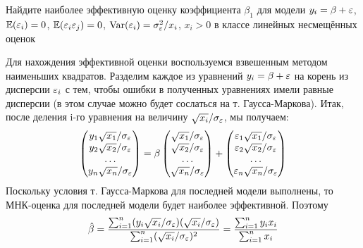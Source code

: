 \begin{problem}
Найдите наиболее эффективную оценку коэффициента $\beta_1$ для модели $y_i = \beta + \varepsilon$, $\mathbb{E}(\varepsilon_i) = 0$, $\mathbb{E}(\varepsilon_i\varepsilon_j) = 0$, $\operatorname{Var}(\varepsilon_i) = \sigma_{\varepsilon}^2 / x_i$, $x_i > 0$ в классе линейных несмещённых оценок


\begin{sol}
Для нахождения эффективной оценки воспользуемся взвешенным методом наименьших квадратов. Разделим каждое из уравнений $y_i = \beta + \varepsilon$ на корень из дисперсии $\varepsilon_i$ с тем, чтобы ошибки в полученных уравнениях имели равные дисперсии (в этом случае можно будет сослаться на т. Гаусса-Маркова). Итак, после деления i-го уравнения на величину $\sqrt{x_i}/\sigma_{\varepsilon}$, мы получаем:
\[
\begin{pmatrix}
y_1 \sqrt{x_1}/\sigma_{\varepsilon} \\
y_2 \sqrt{x_2}/\sigma_{\varepsilon} \\
\ldots \\
y_n \sqrt{x_n}/\sigma_{\varepsilon} \\
\end{pmatrix} = \beta \begin{pmatrix}
\sqrt{x_1}/\sigma_{\varepsilon} \\
\sqrt{x_2}/\sigma_{\varepsilon} \\
\ldots \\
\sqrt{x_n}/\sigma_{\varepsilon} \\
\end{pmatrix} + \begin{pmatrix}
\varepsilon_1 \sqrt{x_1}/\sigma_{\varepsilon} \\
\varepsilon_2 \sqrt{x_2}/\sigma_{\varepsilon} \\
\ldots \\
\varepsilon_n \sqrt{x_n}/\sigma_{\varepsilon} \\
\end{pmatrix}
\]
Поскольку условия т. Гаусса-Маркова для последней модели выполнены, то МНК-оценка для последней модели будет наиболее эффективной. Поэтому
\[
\hat{\beta} = \frac{\sum_{i=1}^n (y_i \sqrt{x_i}/\sigma_{\varepsilon})(\sqrt{x_i}/\sigma_{\varepsilon})}{\sum_{i=1}^n (\sqrt{x_i}/\sigma_{\varepsilon})^2} = \frac{\sum_{i=1}^n y_i x_i}{\sum_{i=1}^n x_i}
\]
\end{sol}
\end{problem}



